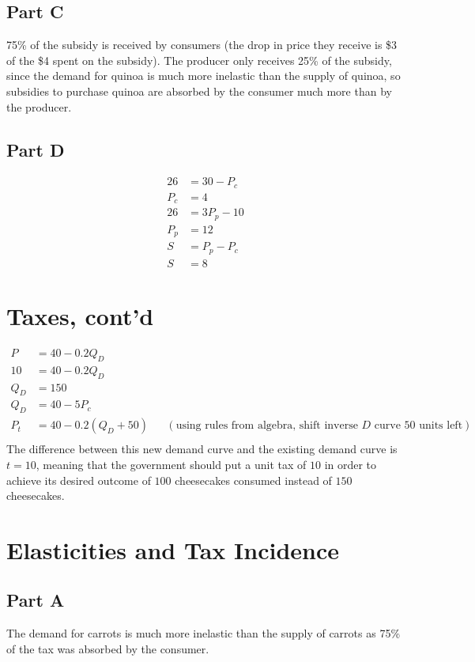\documentclass[8pt]{extarticle}
\newcommand{\plain}[1]{\textrm{#1}}
\begin{document}
{\subsection*{Part C}
75\% of the subsidy is received by consumers (the drop in price they receive is \$3 of the \$4 spent on the subsidy). The producer only receives 25\% of the subsidy, since the demand for quinoa is much more inelastic than the supply of quinoa, so subsidies to purchase quinoa are absorbed by the consumer much more than by the producer.
\subsection*{Part D}
\begin{align*}
	26 &= 30 - P_c\\
	P_c &= 4\\
	26 &= 3P_p - 10\\
	P_p &= 12\\
	S &= P_p - P_c\\
	S &= \boxed{8}
\end{align*}
\section*{Taxes, cont'd}
\begin{align*}
	P &= 40-0.2Q_D\\
	10 &= 40-0.2Q_D\\
	Q_D &= 150\\
	Q_D &= 40-5P_c\\
	P_t &= 40-0.2(Q_D+50) && (\plain{using rules from algebra, shift inverse $D$ curve 50 units left})\\
\end{align*}
The difference between this new demand curve and the existing demand curve is $t= 10$, meaning that the government should put a unit tax of $10$ in order to achieve its desired outcome of $100$ cheesecakes consumed instead of $150$ cheesecakes.
\section*{Elasticities and Tax Incidence}
\subsection*{Part A}
The demand for carrots is much more inelastic than the supply of carrots as 75\% of the tax was absorbed by the consumer.
}
\end{document}
